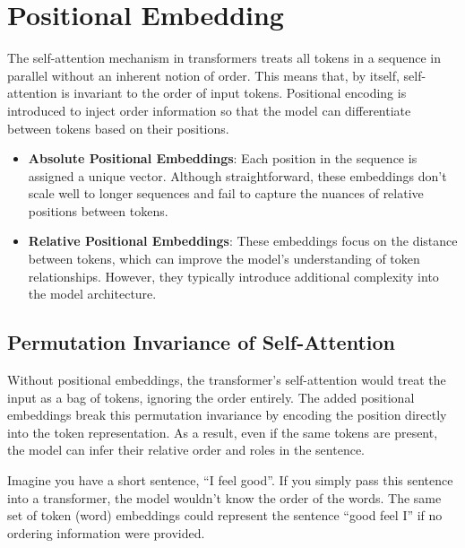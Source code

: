 
   

\section{Positional Embedding}

The self-attention mechanism in transformers treats all tokens in a sequence in parallel without an inherent notion of order. This means that, by itself, self-attention is invariant to the order of input tokens. Positional encoding is introduced to inject order information so that the model can differentiate between tokens based on their positions.
\begin{itemize}
	\item \textbf{Absolute Positional Embeddings}: Each position in the sequence is assigned a unique vector. Although straightforward, these embeddings don't scale well to longer sequences and fail to capture the nuances of relative positions between tokens.
	\item \textbf{Relative Positional Embeddings}: These embeddings focus on the distance between tokens, which can improve the model’s understanding of token relationships. However, they typically introduce additional complexity into the model architecture.
\end{itemize}

\subsection{Permutation Invariance of Self-Attention}

Without positional embeddings, the transformer's self-attention would treat the input as a bag of tokens, ignoring the order entirely. The added positional embeddings break this permutation invariance by encoding the position directly into the token representation. As a result, even if the same tokens are present, the model can infer their relative order and roles in the sentence.

Imagine you have a short sentence, ``I feel good''. If you simply pass this sentence into a transformer, the model wouldn't know the order of the words. The same set of token (\ie word) embeddings could represent the sentence ``good feel I'' if no ordering information were provided.

